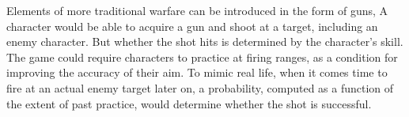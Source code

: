 Elements of more traditional warfare can be introduced in the form of guns,
\etc\@
A character would be able to acquire a gun and shoot at a target, including
an enemy character.
But whether the shot hits is determined by the character's skill.
The game could require characters to practice at firing
ranges, as a condition for improving the accuracy of their aim.
To mimic real life, when it comes time to fire at an actual enemy target later
on, a probability, computed as a function of the extent of past practice, would
determine whether the shot is successful.
